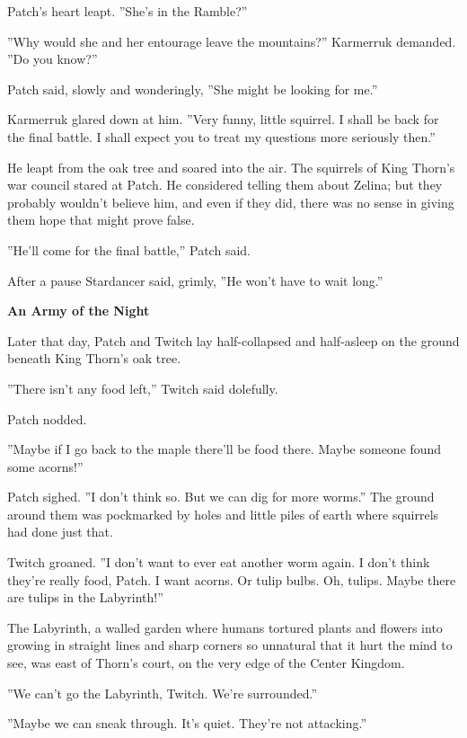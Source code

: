 \documentclass[11pt]{article}
\begin{document}
 Patch's heart leapt. ''She's in the Ramble?''\par
 ''Why would she and her entourage leave the mountains?'' Karmerruk demanded. ''Do you know?''\par
 Patch said, slowly and wonderingly, ''She might be looking for me.''\par
 Karmerruk glared down at him. ''Very funny, little squirrel. I shall be back for the final battle. I shall expect you to treat my questions more seriously then.''\par
 He leapt from the oak tree and soared into the air. The squirrels of King Thorn's war council stared at Patch. He considered telling them about Zelina; but they probably wouldn't believe him, and even if they did, there was no sense in giving them hope that might prove false.\par
 ''He'll come for the final battle,'' Patch said.\par
 After a pause Stardancer said, grimly, ''He won't have to wait long.''\par
\par
{\bf An Army of the Night\par
}\par
 Later that day, Patch and Twitch lay half-collapsed and half-asleep on the ground beneath King Thorn's oak tree.\par
 ''There isn't any food left,'' Twitch said dolefully.\par
 Patch nodded.\par
 ''Maybe if I go back to the maple there'll be food there. Maybe someone found some acorns!''\par
 Patch sighed. ''I don't think so. But we can dig for more worms.'' The ground around them was pockmarked by holes and little piles of earth where squirrels had done just that.\par
 Twitch groaned. ''I don't want to ever eat another worm again. I don't think they're really food, Patch. I want acorns. Or tulip bulbs. Oh, tulips. Maybe there are tulips in the Labyrinth!''\par
 The Labyrinth, a walled garden where humans tortured plants and flowers into growing in straight lines and sharp corners so unnatural that it hurt the mind to see, was east of Thorn's court, on the very edge of the Center Kingdom.\par
 ''We can't go the Labyrinth, Twitch. We're surrounded.''\par
 ''Maybe we can sneak through. It's quiet. They're not attacking.''\par
\end{document}
